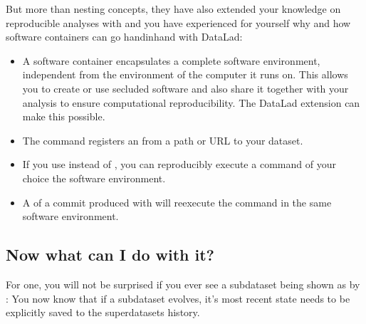 \sphinxAtStartPar
But more than nesting concepts, they have also extended your knowledge on
reproducible analyses with  and you have experienced
for yourself why and how software containers can go hand\sphinxhyphen{}in\sphinxhyphen{}hand with DataLad:
\begin{itemize}
\item {} 
\sphinxAtStartPar
A software container encapsulates a complete software environment, independent
from the environment of the computer it runs on. This allows you to create or
use secluded software and also share it together with your analysis to ensure
computational reproducibility. The DataLad extension
can make this possible.

\item {} 
\sphinxAtStartPar
The command  registers an {\hyperref[\detokenize{glossary:term-container-image}]{}} from a path or
URL to your dataset.

\item {} 
\sphinxAtStartPar
If you use  instead of ,
you can reproducibly execute a command of your choice  the software
environment.

\item {} 
\sphinxAtStartPar
A  of a commit produced with 
will re\sphinxhyphen{}execute the command in the same software environment.

\end{itemize}

\ignorespaces 

\subsection{Now what can I do with it?}
\label{\detokenize{basics/101-134-summary:now-what-can-i-do-with-it}}\label{\detokenize{basics/101-134-summary:index-0}}
\sphinxAtStartPar
For one, you will not be surprised if you ever see a subdataset being shown as
 by : You now know that if a subdataset
evolves, it’s most recent state needs to be explicitly saved to the superdatasets
history.

